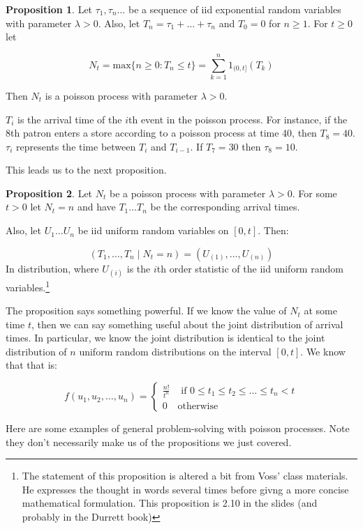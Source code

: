 \documentclass[12pt]{article}
\theoremstyle{definition}
\newtheorem{proposition}{Proposition}[section]
\begin{document}
\begin{proposition}
  Let $\tau_1, \tau_n \dots$ be a sequence of iid exponential random variables with parameter $\lambda > 0$. Also, let $T_n = \tau_1 + \dots + \tau_n$ and $T_0 = 0$ for $n \geq 1$. For $t \geq 0$ let

  $$
N_t = \text{max}\{n \geq 0: T_n \leq t\} = \sum_{k=1}^n 1_{(0,t]}(T_k)
  $$

  Then $N_t$ is a poisson process with parameter $\lambda > 0$.
\end{proposition}

$T_i$ is the arrival time of the $i$th event in the poisson process. For instance, if the 8th patron enters a store according to a poisson process at time 40, then $T_8 = 40$. $\tau_i$ represents the time between $T_i$ and $T_{i-1}$. If $T_7 = 30$ then $\tau_8 = 10$.

This leads us to the next proposition.

\begin{proposition}
  Let $N_t$ be a poisson process with parameter $\lambda > 0$. For some $t> 0$ let $N_t = n$ and have $T_1 \dots T_n$ be the corresponding arrival times.

  Also, let $U_1 \dots U_n$ be iid uniform random variables on $[0,t]$. Then:

  $$
(T_1, \dots, T_n \mid N_t = n) = (U_{(1)}, \dots , U_{(n)})
  $$
  In distribution, where $U_{(i)}$ is the $i$th order statistic of the iid uniform random variables.\footnote{The statement of this proposition is altered a bit from Voss' class materials. He expresses the thought in words several times before givng a more concise mathematical formulation. This proposition is 2.10 in the slides (and probably in the Durrett book)}
\end{proposition}

The proposition says something powerful. If we know the value of $N_t$ at some time $t$, then we can say something useful about the joint distribution of arrival times. In particular, we know the joint distribution is identical to the joint distribution of $n$ uniform random distributions on the interval $[0,t]$. We know that that is:

$$
f(u_1, u_2, \dots, u_n) = \begin{cases}
  \frac{n!}{t^n} & \text{ if } 0 \leq t_1 \leq t_2  \leq  \dots \leq t_n < t \\
  0 & \text{otherwise}
\end{cases}
$$

Here are some examples of general problem-solving with poisson processes. Note they don't necessarily make us of the propositions we just covered.
\end{document}
